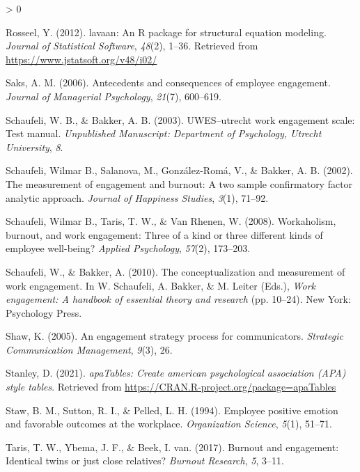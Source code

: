 \documentclass[
  english,
  man]{apa6}
\newlength{\cslhangindent}
\newenvironment{CSLReferences}[2] %
 {%
  \setlength{\parindent}{0pt}
  \ifodd #1 \everypar{\setlength{\hangindent}{\cslhangindent}}\ignorespaces\fi
  \ifnum #2 > 0
  \setlength{\parskip}{#2\baselineskip}
  \fi
 }%
 {}
\begin{document}
\begin{CSLReferences}{1}{0}
\leavevmode\hypertarget{ref-R-lavaan}{}%
Rosseel, Y. (2012). {lavaan}: An {R} package for structural equation modeling. \emph{Journal of Statistical Software}, \emph{48}(2), 1--36. Retrieved from \url{https://www.jstatsoft.org/v48/i02/}

\leavevmode\hypertarget{ref-saks2006antecedents}{}%
Saks, A. M. (2006). Antecedents and consequences of employee engagement. \emph{Journal of Managerial Psychology}, \emph{21}(7), 600--619.

\leavevmode\hypertarget{ref-schaufeli_uwesutrecht_2003}{}%
Schaufeli, W. B., \& Bakker, A. B. (2003). {UWES}--utrecht work engagement scale: Test manual. \emph{Unpublished Manuscript: Department of Psychology, Utrecht University}, \emph{8}.

\leavevmode\hypertarget{ref-schaufeli_measurement_2002}{}%
Schaufeli, Wilmar B., Salanova, M., González-Romá, V., \& Bakker, A. B. (2002). The measurement of engagement and burnout: A two sample confirmatory factor analytic approach. \emph{Journal of Happiness Studies}, \emph{3}(1), 71--92.

\leavevmode\hypertarget{ref-schaufeli2008workaholism}{}%
Schaufeli, Wilmar B., Taris, T. W., \& Van Rhenen, W. (2008). Workaholism, burnout, and work engagement: Three of a kind or three different kinds of employee well-being? \emph{Applied Psychology}, \emph{57}(2), 173--203.

\leavevmode\hypertarget{ref-schaufeli_conceptualization_2010}{}%
Schaufeli, W., \& Bakker, A. (2010). The conceptualization and measurement of work engagement. In W. Schaufeli, A. Bakker, \& M. Leiter (Eds.), \emph{Work engagement: A handbook of essential theory and research} (pp. 10--24). New York: Psychology Press.

\leavevmode\hypertarget{ref-shaw2005engagement}{}%
Shaw, K. (2005). An engagement strategy process for communicators. \emph{Strategic Communication Management}, \emph{9}(3), 26.

\leavevmode\hypertarget{ref-R-apaTables}{}%
Stanley, D. (2021). \emph{apaTables: Create american psychological association (APA) style tables}. Retrieved from \url{https://CRAN.R-project.org/package=apaTables}

\leavevmode\hypertarget{ref-staw_employee_1994}{}%
Staw, B. M., Sutton, R. I., \& Pelled, L. H. (1994). Employee positive emotion and favorable outcomes at the workplace. \emph{Organization Science}, \emph{5}(1), 51--71.

\leavevmode\hypertarget{ref-taris2017burnout}{}%
Taris, T. W., Ybema, J. F., \& Beek, I. van. (2017). Burnout and engagement: Identical twins or just close relatives? \emph{Burnout Research}, \emph{5}, 3--11.


\end{CSLReferences}
\end{document}
